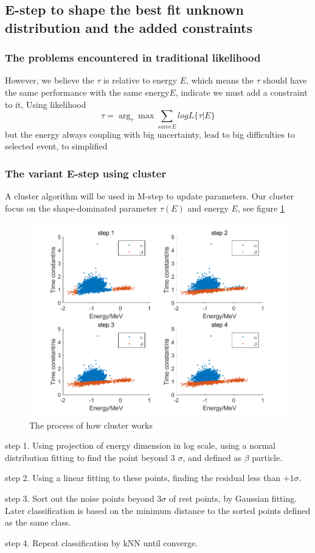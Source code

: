 \documentclass{article}
\begin{document}
\subsection{E-step to shape the best fit unknown distribution and the added constraints}
\subsubsection{The problems encountered in traditional likelihood}
\par However, we believe the $\tau$ is relative to energy $E$, which means the $\tau$ should have the same performance with the same energy$E$, indicate we must add a constraint to it, Using likelihood 
$$ \tau = \arg_\tau\max\sum_{same E}log L{\{\tau|E\}} $$
but the energy always coupling with big uncertainty, lead to big difficulties to selected event, to simplified

\subsubsection{The variant E-step using cluster}
\par A cluster algorithm will be used in M-step to update parameters. Our cluster focus on the shape-dominated parameter $\tau(E)$ and energy $E$, see figure \ref{fig:2}

	\begin{figure}[h]
	\centering\includegraphics[width=5 in]{./figure/figure1.png}
	\caption{The process of how cluster works }
	\label{fig:2}
	\end{figure}
	
	\par step 1. Using projection of energy dimension in log scale, using a normal distribution fitting to find the point beyond 3 $\sigma$, and defined as $\beta$ particle.
	\par step 2. Using a linear fitting to these points, finding the residual less than $+1 \sigma$. 
	\par step 3. Sort out the noise points beyond $3\sigma$ of rest points, by Gaussian fitting. Later classification is based on the minimum distance to the sorted points defined as the same class. 
	\par step 4. Repeat classification by kNN until converge.
	
\end{document}
